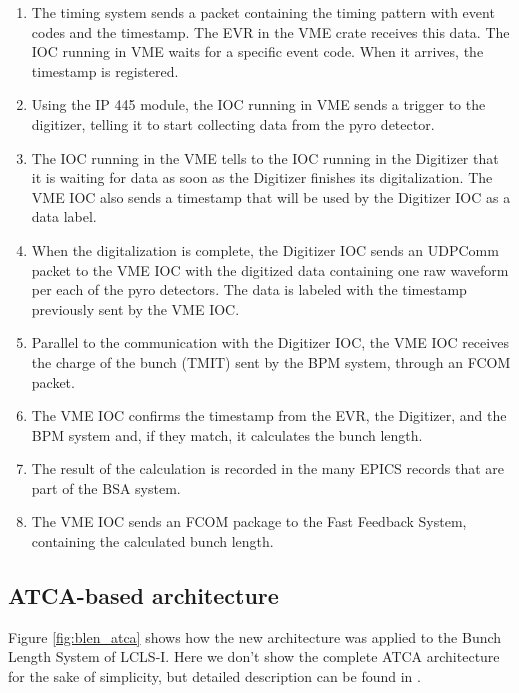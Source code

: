 \documentclass[letter,
               biblatex,     %
               keeplastbox,   %
               ]{jacow}
\begin{document}
\begin{enumerate}
   \item The timing system sends a packet containing the timing pattern with event codes and the timestamp. The EVR in the VME crate receives this data. The IOC running in VME waits for a specific event code. When it arrives, the timestamp is registered.
   \item Using the IP 445 module, the IOC running in VME sends a trigger to the digitizer, telling it to start collecting data from the pyro detector.
   \item The IOC running in the VME tells to the IOC running in the Digitizer that it is waiting for data as soon as the Digitizer finishes its digitalization. The VME IOC also sends a timestamp that will be used by the Digitizer IOC as a data label.
   \item When the digitalization is complete, the Digitizer IOC sends an UDPComm packet to the VME IOC with the digitized data containing one raw waveform per each of the pyro detectors. The data is labeled with the timestamp previously sent by the VME IOC. 
   \item Parallel to the communication with the Digitizer IOC, the VME IOC receives the charge of the bunch (TMIT) sent by the BPM system, through an FCOM packet.
   \item The VME IOC confirms the timestamp from the EVR, the Digitizer, and the BPM system and, if they match, it calculates the bunch length.
   \item The result of the calculation is recorded in the many EPICS records that are part of the BSA system.
   \item The VME IOC sends an FCOM package to the Fast Feedback System, containing the calculated bunch length.
\end{enumerate}

\subsection{ATCA-based architecture}
Figure \ref{fig:blen_atca} shows how the new architecture was applied to the Bunch Length System of LCLS-I. Here we don't show the complete ATCA architecture for the sake of simplicity, but detailed description can be found in \cite{ryan-2016, atca-bpm-2017}.
\end{document}
